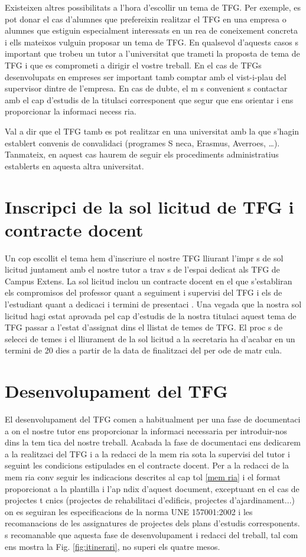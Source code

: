 Existeixen altres possibilitats a l'hora d'escollir un tema de TFG. Per exemple, es pot donar el cas d'alumnes que prefereixin realitzar el TFG en una empresa o alumnes que estiguin especialment interessats en un  rea de coneixement concreta i ells mateixos vulguin proposar un tema de TFG. En qualsevol d'aquests casos  s important que trobeu un tutor a l'universitat que trameti la proposta de tema de TFG i que es comprometi a dirigir el vostre treball. En el cas de TFGs desenvolupats en empreses ser  important tamb  comptar amb el vist-i-plau del supervisor dintre de l'empresa. En cas de dubte, el m s convenient  s contactar amb el cap d'estudis de la titulaci  corresponent que segur que ens orientar  i ens proporcionar  la informaci  necess ria.

Val a dir que el TFG tamb  es pot realitzar en una universitat amb la que s'hagin establert convenis de convalidaci  (programes S neca, Erasmus, Averroes, \ldots). Tanmateix, en aquest cas haurem de seguir els procediments administratius establerts en aquesta altra universitat.

\section{Inscripci  de la sol licitud de TFG i contracte docent}

Un cop escollit el tema hem d'inscriure el nostre TFG lliurant l'impr s de sol licitud juntament amb el nostre tutor a trav s de l'espai dedicat als TFG de Campus Extens.  La sol licitud inclou un contracte docent en el que s'establiran els compromisos del professor quant a seguiment i supervisi  del TFG i els de l'estudiant quant a dedicaci  i termini de presentaci .  Una vegada que la nostra sol licitud hagi estat aprovada pel cap d'estudis de la nostra titulaci  aquest tema de TFG passar  a l'estat d'assignat dins el llistat de temes de TFG. El proc s de selecci  de temes i el lliurament de la sol licitud a la secretaria ha d'acabar en un termini de 20 dies a partir de la data de finalitzaci  del per ode de matr cula.

\section{Desenvolupament del TFG}

El desenvolupament del TFG comen a habitualment per una fase de documentaci  a on el nostre tutor ens proporcionar  la informaci  necessaria per introduir-nos dins la tem tica del nostre treball. Acabada la fase de documentaci  ens dedicarem a la realitzaci  del TFG i a la redacci  de la mem ria sota la supervisi  del tutor i seguint les condicions estipulades en el contracte docent. Per a la redacci  de la mem ria conv  seguir les indicacions descrites al cap tol \ref{mem ria} i el format proporcionat a la plantilla i l'ap ndix d'aquest document, exceptuant en el cas de projectes t cnics (projectes de rehabilitaci  d'edificis, projectes d'ajardinament...) on es seguiran les especificacions de la norma UNE 157001:2002 i les recomanacions de les assignatures de projectes dels plans d'estudis corresponents.  s recomanable que aquesta fase de desenvolupament i redacci  del treball, tal com ens mostra la Fig. \ref{fig:itinerari}, no superi els quatre mesos.

